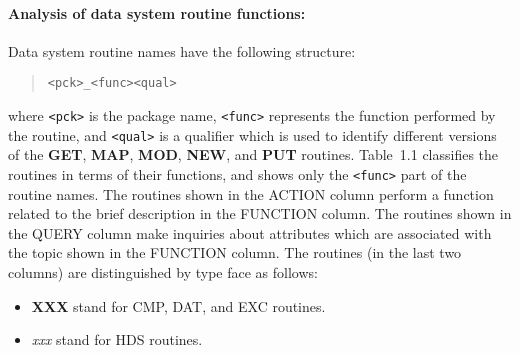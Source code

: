 \newpage

\paragraph{Analysis of data system routine functions:} \hfill

\vspace*{5mm}

Data system routine names have the following structure:
\begin{quote}
{\tt <pck>\_<func><qual>}
\end{quote}
where {\tt <pck>} is the package name, {\tt <func>} represents the function
performed by the routine, and {\tt <qual>} is a qualifier which is used to
identify different versions of the {\bf GET}, {\bf MAP}, {\bf MOD}, {\bf NEW},
and {\bf PUT} routines.
Table~1.1 classifies the routines in terms of their functions, and
shows only the {\tt <func>} part of the routine names.
The routines shown in the ACTION column perform a function related to the
brief description in the FUNCTION column.
The routines shown in the QUERY column make inquiries about attributes which
are associated with the topic shown in the FUNCTION column.
The routines (in the last two columns) are distinguished by type face as
follows:
\begin{itemize}
\item {\bf XXX} stand for CMP, DAT, and EXC routines.
\item {\em xxx} stand for HDS routines.
\end{itemize}

\vspace*{5mm}

